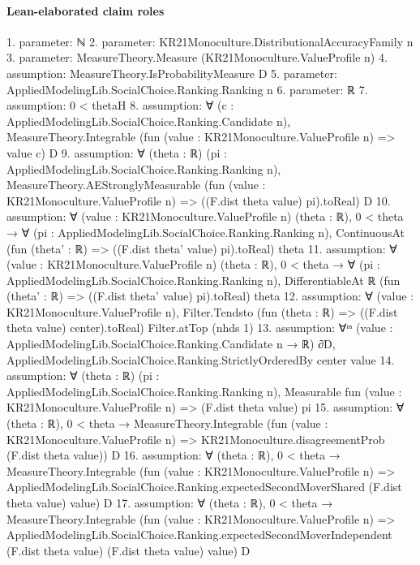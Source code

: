 \documentclass[10pt]{article}
\begin{document}
\paragraph{Lean-elaborated claim roles}\begin{ReviewVerbatim}
1. parameter: ℕ
2. parameter: KR21Monoculture.DistributionalAccuracyFamily n
3. parameter: MeasureTheory.Measure (KR21Monoculture.ValueProfile n)
4. assumption: MeasureTheory.IsProbabilityMeasure D
5. parameter: AppliedModelingLib.SocialChoice.Ranking.Ranking n
6. parameter: ℝ
7. assumption: 0 < thetaH
8. assumption: ∀ (c : AppliedModelingLib.SocialChoice.Ranking.Candidate n),
  MeasureTheory.Integrable (fun (value : KR21Monoculture.ValueProfile n) => value c) D
9. assumption: ∀ (theta : ℝ) (pi : AppliedModelingLib.SocialChoice.Ranking.Ranking n),
  MeasureTheory.AEStronglyMeasurable (fun (value : KR21Monoculture.ValueProfile n) => ((F.dist theta value) pi).toReal)
    D
10. assumption: ∀ (value : KR21Monoculture.ValueProfile n) (theta : ℝ),
  0 < theta →
    ∀ (pi : AppliedModelingLib.SocialChoice.Ranking.Ranking n),
      ContinuousAt (fun (theta' : ℝ) => ((F.dist theta' value) pi).toReal) theta
11. assumption: ∀ (value : KR21Monoculture.ValueProfile n) (theta : ℝ),
  0 < theta →
    ∀ (pi : AppliedModelingLib.SocialChoice.Ranking.Ranking n),
      DifferentiableAt ℝ (fun (theta' : ℝ) => ((F.dist theta' value) pi).toReal) theta
12. assumption: ∀ (value : KR21Monoculture.ValueProfile n),
  Filter.Tendsto (fun (theta : ℝ) => ((F.dist theta value) center).toReal) Filter.atTop (nhds 1)
13. assumption: ∀ᵐ (value : AppliedModelingLib.SocialChoice.Ranking.Candidate n → ℝ) ∂D,
  AppliedModelingLib.SocialChoice.Ranking.StrictlyOrderedBy center value
14. assumption: ∀ (theta : ℝ) (pi : AppliedModelingLib.SocialChoice.Ranking.Ranking n),
  Measurable fun (value : KR21Monoculture.ValueProfile n) => (F.dist theta value) pi
15. assumption: ∀ (theta : ℝ),
  0 < theta →
    MeasureTheory.Integrable
      (fun (value : KR21Monoculture.ValueProfile n) => KR21Monoculture.disagreementProb (F.dist theta value)) D
16. assumption: ∀ (theta : ℝ),
  0 < theta →
    MeasureTheory.Integrable
      (fun (value : KR21Monoculture.ValueProfile n) =>
        AppliedModelingLib.SocialChoice.Ranking.expectedSecondMoverShared (F.dist theta value) value)
      D
17. assumption: ∀ (theta : ℝ),
  0 < theta →
    MeasureTheory.Integrable
      (fun (value : KR21Monoculture.ValueProfile n) =>
        AppliedModelingLib.SocialChoice.Ranking.expectedSecondMoverIndependent (F.dist theta value) (F.dist theta value)
          value)
      D

\end{ReviewVerbatim}
\end{document}
